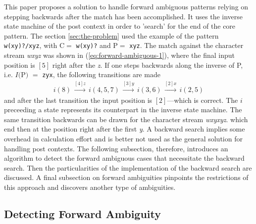 \documentclass[acmtoplas]{acmtrans2m}
\newcommand{\eqref}[1]{(\ref{eq:#1})}
\newcommand{\finv}[1]{$I(${\sf #1}$)$}
\newcommand{\pP}{{\sf P}}
\newcommand{\pC}{{\sf C}}
\begin{document}
This paper proposes a solution to handle forward ambiguous patterns 
relying on stepping backwards after the match has been accomplished. 
It uses the inverse state machine of the post context in order to 'search'
for the end of the core pattern. The section \ref{sec:the-problem} used the example
of the pattern \verb|w(xy)?/xyz|, with  \pC $=$ {\tt w(xy)?} and \pP $=$ {\tt xyz}. The match against the character
stream {\it wxyz} was shown in \eqref{forward-ambiguous-1}, where
the final input position is $[5]$ right after the {\it z}. If one
steps backwards along the inverse of \pP, i.e. \finv{P} $=$ {\tt zyx},
      the following transitions are made
\begin{eqnarray}
\label{eq:forward-ambiguous-inverse}
i(8)     \, \stackrel{[4]z}{\longrightarrow} \,
i(4,5,7) \, \stackrel{[3]y}{\longrightarrow} \,
i(3,6)   \, \stackrel{[2]x}{\longrightarrow} \,
i(2,5)
\end{eqnarray}
and after the last transition the input position is $[2]$---which is correct.
The $i$ preceeding a state represents its 
counterpart in the inverse state machine. The same transition backwards
can be drawn for the character stream {\it wxyxyz}.
which end then at the position right after the first {\it y}. A backward search implies some
overhead in calculation effort and is better not used as the general solution
for handling post contexts. The following subsection, therefore, introduces an
algorithm to detect the forward ambiguous cases that necessitate the backward
search. Then the particularities of the implementation of the backward search
are discussed. A final subsection on forward ambiguities pinpoints the
restrictions of this approach and discovers another type of ambiguities.


\subsection{Detecting Forward Ambiguity}
\end{document}
